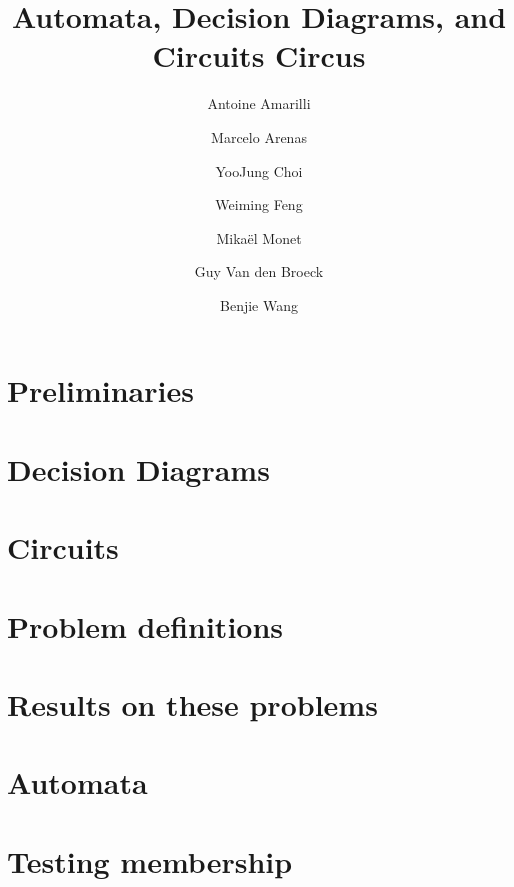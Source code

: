 \documentclass[letterpaper,11pt]{article}
\begin{document}
\title{Automata, Decision Diagrams, and Circuits Circus}

\author{Antoine Amarilli \and Marcelo Arenas \and YooJung Choi \and Weiming Feng \and Mikaël Monet \and Guy Van den Broeck \and Benjie Wang}

\date{}
\maketitle

\section{Preliminaries}


\section{Decision Diagrams}


\section{Circuits}


\section{Problem definitions}


\section{Results on these problems}


\section{Automata}


\section{Testing membership}




\end{document}
